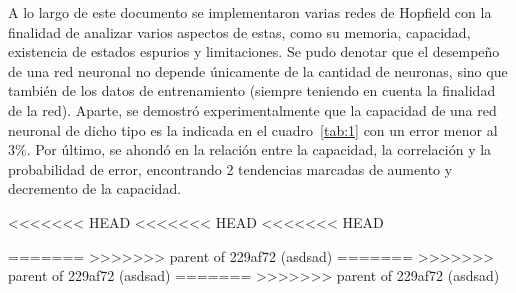 \documentclass[11pt]{article} %
\begin{document}
A lo largo de este documento se implementaron varias redes de Hopfield con la finalidad de analizar varios aspectos de estas, como su memoria, capacidad, existencia de estados espurios y limitaciones. Se pudo denotar que el desempeño de una red neuronal no depende únicamente de la cantidad de neuronas, sino que también de los datos de entrenamiento (siempre teniendo en cuenta la finalidad de la red). Aparte, se demostró experimentalmente que la capacidad de una red neuronal de dicho tipo es la indicada en el cuadro~\ref{tab:1} con un error menor al $3\%$. Por último, se ahondó en la relación entre la capacidad, la correlación y la probabilidad de error, encontrando 2 tendencias marcadas de aumento y decremento de la capacidad. 

<<<<<<< HEAD
<<<<<<< HEAD
<<<<<<< HEAD

=======
>>>>>>> parent of 229af72 (asdsad)
=======
>>>>>>> parent of 229af72 (asdsad)
=======
>>>>>>> parent of 229af72 (asdsad)
\end{document}
